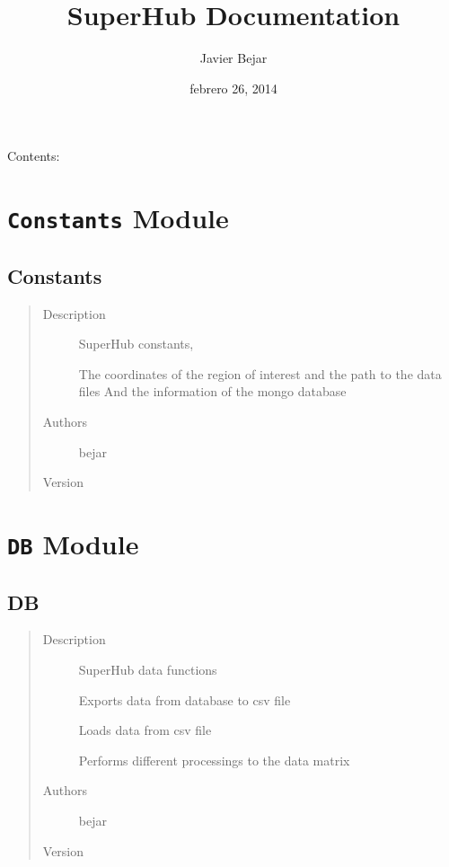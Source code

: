\documentclass[letterpaper,10pt,english]{sphinxmanual}
\title{SuperHub Documentation}
\date{febrero 26, 2014}
\author{Javier Bejar}
\begin{document}
\maketitle
\tableofcontents
{}\label{index::doc}


Contents:


\chapter{\texttt{Constants} Module}
\label{index:constants-module}\label{index:welcome-to-superhub-s-documentation}\label{index:module-SuperHub.Constants}\label{index:module-SuperHubConstants}

\section{Constants}
\label{index:constants}\begin{quote}\begin{description}
\item[{Description}] \leavevmode
SuperHub constants,

The coordinates of the region of interest and the path to the data files
And the information of the mongo database

\item[{Authors}] \leavevmode
bejar

\item[{Version}] 

\end{description}\end{quote}


\chapter{\texttt{DB} Module}
\label{index:module-SuperHub.DB}\label{index:db-module}\label{index:module-DB}

\section{DB}
\label{index:db}\begin{quote}\begin{description}
\item[{Description}] \leavevmode
SuperHub data functions

Exports data from database to csv file

Loads data from csv file

Performs different processings to the data matrix

\item[{Authors}] \leavevmode
bejar

\item[{Version}] 

\end{description}\end{quote}
\end{document}

